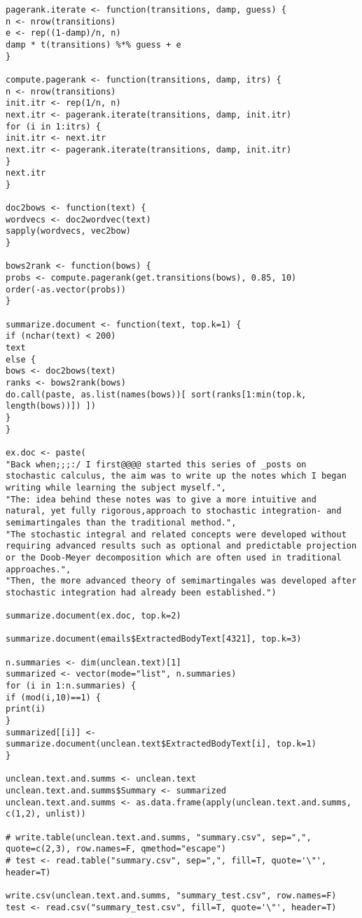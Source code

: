 \begin{verbatim}
pagerank.iterate <- function(transitions, damp, guess) {
n <- nrow(transitions)
e <- rep((1-damp)/n, n)
damp * t(transitions) %*% guess + e
}

compute.pagerank <- function(transitions, damp, itrs) {
n <- nrow(transitions)
init.itr <- rep(1/n, n)
next.itr <- pagerank.iterate(transitions, damp, init.itr)
for (i in 1:itrs) {
init.itr <- next.itr
next.itr <- pagerank.iterate(transitions, damp, init.itr)
}
next.itr
}

doc2bows <- function(text) {
wordvecs <- doc2wordvec(text)
sapply(wordvecs, vec2bow)
}

bows2rank <- function(bows) {
probs <- compute.pagerank(get.transitions(bows), 0.85, 10)
order(-as.vector(probs))
}

summarize.document <- function(text, top.k=1) {
if (nchar(text) < 200)
text
else {
bows <- doc2bows(text)
ranks <- bows2rank(bows)
do.call(paste, as.list(names(bows))[ sort(ranks[1:min(top.k, length(bows))]) ])
}
}

ex.doc <- paste(
"Back when;;;:/ I first@@@@ started this series of _posts on stochastic calculus, the aim was to write up the notes which I began writing while learning the subject myself.",
"The: idea behind these notes was to give a more intuitive and natural, yet fully rigorous,approach to stochastic integration- and semimartingales than the traditional method.",
"The stochastic integral and related concepts were developed without requiring advanced results such as optional and predictable projection or the Doob-Meyer decomposition which are often used in traditional approaches.",
"Then, the more advanced theory of semimartingales was developed after stochastic integration had already been established.")

summarize.document(ex.doc, top.k=2)

summarize.document(emails$ExtractedBodyText[4321], top.k=3)

n.summaries <- dim(unclean.text)[1]
summarized <- vector(mode="list", n.summaries)
for (i in 1:n.summaries) {
if (mod(i,10)==1) {
print(i)
}
summarized[[i]] <- summarize.document(unclean.text$ExtractedBodyText[i], top.k=1)
}

unclean.text.and.summs <- unclean.text
unclean.text.and.summs$Summary <- summarized
unclean.text.and.summs <- as.data.frame(apply(unclean.text.and.summs, c(1,2), unlist))

# write.table(unclean.text.and.summs, "summary.csv", sep=",", quote=c(2,3), row.names=F, qmethod="escape")
# test <- read.table("summary.csv", sep=",", fill=T, quote='\"', header=T)

write.csv(unclean.text.and.summs, "summary_test.csv", row.names=F)
test <- read.csv("summary_test.csv", fill=T, quote='\"', header=T)

\end{verbatim}